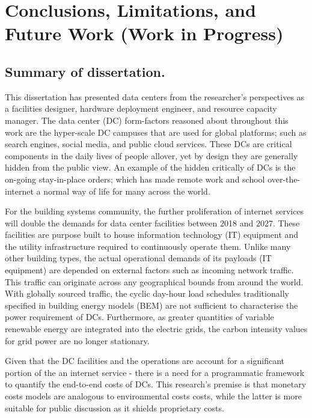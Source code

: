 \chapter{Conclusions, Limitations, and Future Work (Work in Progress)}
\label{chp:conclusions}

\section{Summary of dissertation.}

This dissertation has presented data centers from the researcher's perspectives as a facilities designer, hardware deployment engineer, and resource capacity manager. The data center (DC) form-factors reasoned about throughout this work are the hyper-scale DC campuses that are used for global platforms; such as search engines, social media, and public cloud services. These DCs are critical components in the daily lives of people allover, yet by design they are generally hidden from the public view. An example of the hidden critically of DCs is the on-going stay-in-place orders; which has made remote work and school over-the-internet a normal way of life for many across the world. 

For the building systems community, the further proliferation of internet services will double the demands for data center facilities between 2018 and 2027. These facilities are purpose built to house information technology (IT) equipment and the utility infrastructure required to continuously operate them. Unlike many other building types, the actual operational demands of its payloads (IT equipment) are depended on external factors such as incoming network traffic. This traffic can originate across any geographical bounds from around the world. With globally sourced traffic, the cyclic day-hour load schedules traditionally specified in building energy models (BEM) are not sufficient to characterise the power requirement of DCs. Furthermore, as greater quantities of variable renewable energy are integrated into the electric grids, the carbon intensity values for grid power are no longer stationary. 

Given that the DC facilities and the operations are account for a significant portion of the an internet service - there is a need for a programmatic framework to quantify the end-to-end costs of DCs. This research's premise is that monetary costs models are analogous to environmental costs costs, while the latter is more suitable for public discussion as it shields proprietary costs.

